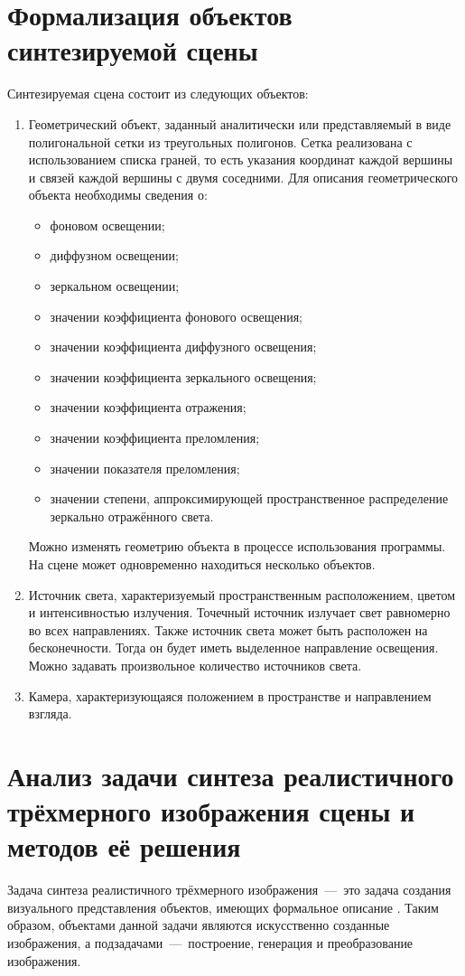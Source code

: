 \section{Формализация объектов синтезируемой сцены}
Синтезируемая сцена состоит из следующих объектов:
\begin{enumerate}[label={\arabic*)}]
	\item Геометрический объект, заданный аналитически или представляемый в виде полигональной сетки из треугольных полигонов. Сетка реализована с использованием списка граней, то есть указания координат каждой вершины и связей каждой вершины с двумя соседними. Для описания геометрического объекта необходимы сведения о:\begin{itemize}
		\item фоновом освещении;
		\item диффузном освещении;
		\item зеркальном освещении;
		\item значении коэффициента фонового освещения;
		\item значении коэффициента диффузного освещения;
		\item значении коэффициента зеркального освещения;
		\item значении коэффициента отражения;
		\item значении коэффициента преломления;
		\item значении показателя преломления;
		\item значении степени, аппроксимирующей пространственное распределение зеркально отражённого света.\end{itemize}
		Можно изменять геометрию объекта в процессе использования программы. На сцене может одновременно находиться несколько объектов.
	\item Источник света, характеризуемый пространственным расположением, цветом и интенсивностью излучения. Точечный источник излучает свет равномерно во всех направлениях. Также источник света может быть расположен на бесконечности. Тогда он будет иметь выделенное направление освещения. Можно задавать произвольное количество источников света.
	\item Камера, характеризующаяся положением в пространстве и направлением взгляда.
\end{enumerate}

\section{Анализ задачи синтеза реалистичного трёхмерного изображения сцены и методов её решения}
Задача синтеза реалистичного трёхмерного изображения~---~это задача создания визуального представления объектов, имеющих формальное описание \cite{item13}. Таким образом, объектами данной задачи являются искусственно созданные изображения, а подзадачами~---~построение, генерация и преобразование изображения.

